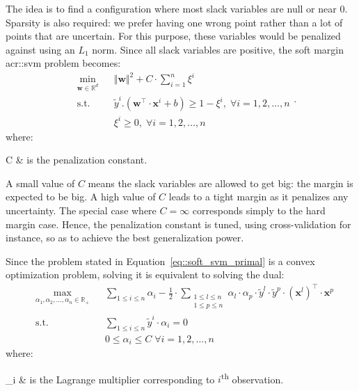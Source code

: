         The idea is to find a configuration where most slack variables are null or near $0$.
        Sparsity is also required: we prefer having one wrong point rather than a lot of points that are uncertain.
        For this purpose, these variables would be penalized against using an $L_1$ norm.
        Since all slack variables are positive, the soft margin \gls{acr::svm} problem becomes:
        \begin{equation}
            \label{eq::soft_svm_primal}
            \begin{aligned}
                & \min_{\bm{w} \in \mathbb{R}^d}
                & & {\Vert \bm{w} \Vert}^2 + C \cdot \sum_{i=1}^n \xi^i \\
                & \text{s.t.} & & \tilde{y}^i.(\bm{w}^\intercal\cdot\bm{x}^i + b) \geq 1 - \xi^i, \; \forall i = 1, 2, \dots, n\\
                & & & \xi^i \geq 0, \; \forall i = 1, 2, \dots, n
            \end{aligned}.
        \end{equation}
        where:
        \begin{conditions}
            C & is the penalization constant.\\
        \end{conditions}

        A small value of $C$ means the slack variables are allowed to get big: the margin is expected to be big.
        A high value of $C$ leads to a tight margin as it penalizes any uncertainty.
        The special case where $C=\infty$ corresponds simply to the hard margin case.
        Hence, the penalization constant is tuned, using cross-validation for instance, so as to achieve the best generalization power.

        Since the problem stated in Equation~\ref{eq::soft_svm_primal} is a convex optimization problem, solving it is equivalent to solving the dual:
        \begin{equation}
            \label{eq::soft_svm_dual}
            \begin{aligned}
                & \max_{\alpha_1, \alpha_2, \dots, \alpha_n \in \mathbb{R}_+}
                & & \sum_{1\leq i \leq n} \alpha_i - \frac{1}{2}\cdot\sum_{\substack{1\leq l \leq n\\1\leq p \leq n}}\alpha_l\cdot\alpha_p\cdot\tilde{y}^l\cdot\tilde{y}^p\cdot(\bm{x}^l)^\intercal\cdot\bm{x}^p\\
                &\text{s.t.} & & \sum_{1 \leq i \leq n}\tilde{y}^i\cdot\alpha_i=0 \\
                & & & 0 \leq \alpha_i \leq C \;\forall i = 1, 2, \dots, n
                \end{aligned}
        \end{equation}
        where:
        \begin{conditions}
            \alpha_i & is the Lagrange multiplier corresponding to \(i\)\textsuperscript{th} observation.\\
        \end{conditions}


